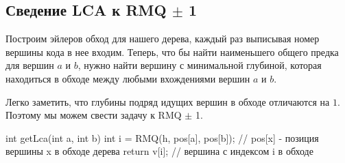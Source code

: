 \subsection[Сведение LCA к RMQ +- 1]{Сведение LCA к RMQ $\pm$ 1}
Построим эйлеров обход для нашего дерева, каждый раз выписывая номер вершины кода в нее входим.
Теперь, что бы найти наименьшего общего предка для вершин $a$ и $b$, нужно найти вершину с минимальной глубиной, 
которая находиться в обходе между любыми вхождениями вершин $a$ и $b$.

Легко заметить, что глубины подряд идущих вершин в обходе отличаются на $1$. Поэтому мы можем свести задачу к RMQ $\pm$ 1.

\begin{cppcode}
int getLca(int a, int b) {
	int i = RMQ(h, pos[a], pos[b]); // pos[x] - позиция вершины x в обходе дерева
	return v[i]; // вершина с индексом i  в обходе
}
\end{cppcode}
